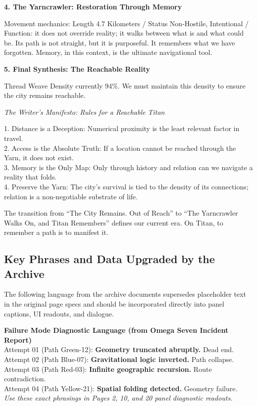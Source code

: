 \documentclass[11pt]{article}
\begin{document}
\begin{archivebox}
\textbf{4. The Yarncrawler: Restoration Through Memory}

Movement mechanics: Length 4.7 Kilometers / Status Non-Hostile, Intentional / Function: it does not override reality; it walks between what is and what could be. Its path is not straight, but it is purposeful. It remembers what we have forgotten. Memory, in this context, is the ultimate navigational tool.

\textbf{5. Final Synthesis: The Reachable Reality}

Thread Weave Density currently 94\%. We must maintain this density to ensure the city remains reachable.

\textit{The Writer's Manifesto: Rules for a Reachable Titan}

1. Distance is a Deception: Numerical proximity is the least relevant factor in travel.\\
2. Access is the Absolute Truth: If a location cannot be reached through the Yarn, it does not exist.\\
3. Memory is the Only Map: Only through history and relation can we navigate a reality that folds.\\
4. Preserve the Yarn: The city's survival is tied to the density of its connections; relation is a non-negotiable substrate of life.

The transition from ``The City Remains. Out of Reach'' to ``The Yarncrawler Walks On, and Titan Remembers'' defines our current era. On Titan, to remember a path is to manifest it.
\end{archivebox}

\subsection{Key Phrases and Data Upgraded by the Archive}

The following language from the archive documents supersedes placeholder text in the original page specs and should be incorporated directly into panel captions, UI readouts, and dialogue.

\begin{archivebox}
\textcolor{archiveGold}{\textbf{Failure Mode Diagnostic Language (from Omega Seven Incident Report)}}\\[4pt]
\small
Attempt 01 (Path Green-12): \textbf{Geometry truncated abruptly.} Dead end.\\
Attempt 02 (Path Blue-07): \textbf{Gravitational logic inverted.} Path collapse.\\
Attempt 03 (Path Red-03): \textbf{Infinite geographic recursion.} Route contradiction.\\
Attempt 04 (Path Yellow-21): \textbf{Spatial folding detected.} Geometry failure.\\[4pt]
\textit{Use these exact phrasings in Pages 2, 10, and 20 panel diagnostic readouts.}
\end{archivebox}
\end{document}

